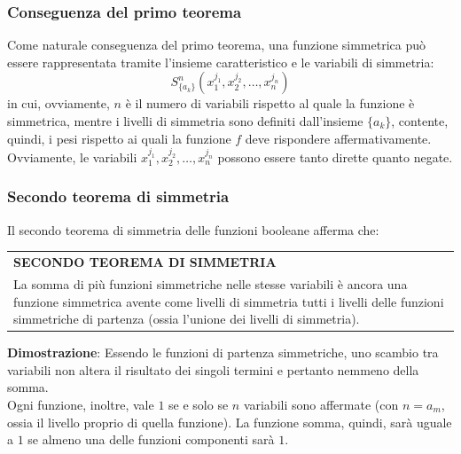 \documentclass[a4paper]{extarticle}
\renewcommand\arraystretch{}
\begin{document}
\vspace{1em}
\noindent
\subsubsection{Conseguenza del primo teorema}
Come naturale conseguenza del primo teorema, una funzione simmetrica può essere rappresentata tramite l'insieme caratteristico e le variabili di simmetria:
\[S^n_{\{a_k\}}(x_1^{j_1}, x_2^{j_2}, \dots, x_n^{j_n})\]
in cui, ovviamente, $n$ è il numero di variabili rispetto al quale la funzione è simmetrica, mentre i livelli di simmetria sono definiti dall'insieme $\{a_k\}$, contente, quindi, i pesi rispetto ai quali la funzione $f$ deve rispondere affermativamente. Ovviamente, le variabili $x_1^{j_1}, x_2^{j_2}, \dots, x_n^{j_n}$ possono essere tanto dirette quanto negate.

\vspace{1em}
\noindent
\subsubsection{Secondo teorema di simmetria}
Il secondo teorema di simmetria delle funzioni booleane afferma che:

\vspace{1em}
\setlength{\tabcolsep}{14pt}
\renewcommand{\arraystretch}{2}
\noindent
\begin{tabularx}{\textwidth}{@{}|P|@{}}
    \hline
    {\textbf{SECONDO TEOREMA DI SIMMETRIA}}\\
    \parbox{\linewidth}{La somma di più funzioni simmetriche nelle stesse variabili è ancora una funzione simmetrica avente come livelli di simmetria tutti i livelli delle funzioni simmetriche di partenza (ossia l'unione dei livelli di simmetria).\vspace{3mm}}\\
    \hline
\end{tabularx}

\vspace{1em}
\noindent
\textbf{Dimostrazione}: Essendo le funzioni di partenza simmetriche, uno scambio tra variabili non altera il risultato dei singoli termini e pertanto nemmeno della somma.\\
Ogni funzione, inoltre, vale $1$ se e solo se $n$ variabili sono
affermate (con $n = a_m$, ossia il livello proprio di quella funzione). La funzione somma, quindi, sarà uguale a $1$ se almeno una delle funzioni componenti sarà $1$.
\end{document}
